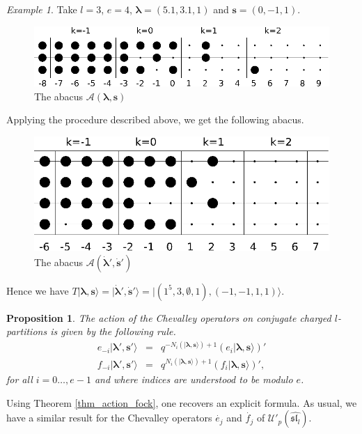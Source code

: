 \documentclass[twoside,12pt]{amsart}
\theoremstyle{plain}
\newcommand{\cA}{\mathcal{A}}
\newcommand{\bs}{\mathbf{s}}
\newcommand{\la}{\lambda}
\newcommand{\bla}{\boldsymbol{\la}}
\newcommand{\dbs}{\dot{\bs}}
\newcommand{\dbla}{\dot{\bla}}
\newcommand{\Ul}{\mathcal{U}'_p (\widehat{\mathfrak{sl}_l})}
\newtheorem{prop}[num]{Proposition}
\theoremstyle{remark}
\newtheorem{exa}[num]{Example}
\begin{document}
\begin{exa}\label{exa_indexation}
Take $l=3$, $e=4$, $\bla = (5.1,3.1,1)$ and $\bs=(0,-1,1)$.
\begin{figure}[H] 
\includegraphics{images/abaque.eps}
\caption{The abacus $\cA(\bla,\bs)$}
\label{ab0}
\end{figure}
Applying the procedure described above, we get the following abacus.
\begin{figure}[H] 
\includegraphics{images/abaque1.eps}
\caption{The abacus $\cA(\dbla',\dbs')$}
\label{ab1}
\end{figure}
Hence we have $T|\bla,\bs\rangle=| \dbla',\dbs'\rangle = |(1^5,3,\emptyset,1),(-1,-1,1,1)\rangle$.
\end{exa}
 

\begin{prop}\label{prop_action_conj}
The action of the Chevalley operators on conjugate charged $l$-partitions
is given by the following rule.
\begin{equation}
\begin{array}{ccl}
e_{-i}|\bla',\bs'\rangle
& = &
q^{-N_{i}(|\bla,\bs\rangle)+1} (e_{i}|\bla,\bs\rangle)'
\\
f_{-i}|\bla',\bs'\rangle
& = &
q^{N_{i}(|\bla,\bs\rangle)+1} (f_{i}|\bla,\bs\rangle)',
\end{array}
\end{equation}
for all $i=0\dots,e-1$ and where indices are understood to be modulo $e$.
\end{prop}

Using Theorem \ref{thm_action_fock}, one recovers an explicit formula.
As usual, we have a similar result for the Chevalley operators
$\dot{e_j}$ and $\dot{f_j}$ of $\Ul$.
\end{document}
